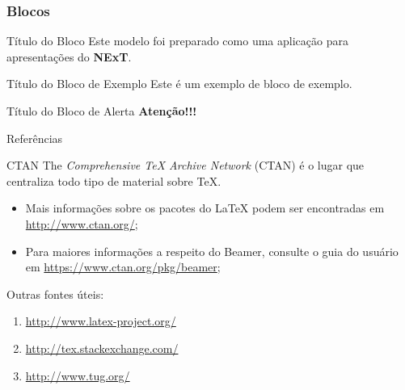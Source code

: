 \documentclass[10pt,aspectratio=43,xcolor,compress]{beamer}
\begin{document}
\begin{frame}
  \frametitle{Blocos}

  \begin{block}{Título do Bloco}
    Este modelo foi preparado como uma aplicação para apresentações do \textbf{NExT}.
  \end{block}

  \begin{exampleblock}{Título do Bloco de Exemplo}
    Este é um exemplo de bloco de exemplo.
  \end{exampleblock}

  \begin{alertblock}{Título do Bloco de Alerta}
    \textbf{Atenção!!!}
  \end{alertblock}


\end{frame}

\begin{frame}{Referências}

  \begin{block}{CTAN}
    The \emph{Com­pre­hen­sive TeX Archive Net­work} (CTAN) é o lugar que centraliza todo tipo de material sobre \TeX{}. 
  \end{block}

  \begin{itemize}
  \item Mais informações sobre os pacotes do \LaTeX{} podem ser encontradas em \url{http://www.ctan.org/};
  \item Para maiores informações a respeito do Beamer, consulte o guia do usuário em \url{https://www.ctan.org/pkg/beamer};
  \end{itemize}

  \vfill{}

  Outras fontes úteis:
  \begin{enumerate}
  \item \url{http://www.latex-project.org/}
  \item \url{http://tex.stackexchange.com/}
  \item \url{http://www.tug.org/}
  \end{enumerate}

\end{frame}


\newcommand{\ExemploPaletaCor}[2]{%
  \setbeamercolor{exemploPaleta}{fg=#1,bg=#2}
  \begin{beamercolorbox}[wd=\linewidth,ht=2ex,leftskip=.5ex,dp=0.7ex]{exemploPaleta}
    \texttt{#1}
  \end{beamercolorbox}
}
\end{document}
